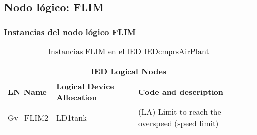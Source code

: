 
\subsection{Nodo l\'ogico: 			 FLIM}

    \subsubsection{Instancias del nodo l\'ogico FLIM}
    \begin{table}[H]
    \begin{center}
    \begin{tabular}{|l|l|p{6.8cm}|}
            \hline
            \multicolumn{3}{|c|}{\cellcolor[gray]{0.8} \textbf{IED Logical Nodes} } \\
            \hline
            \textbf{LN Name} & \textbf{Logical Device Allocation} & \textbf{Code and description} \\
            \hline
            Gv\_FLIM2 & LD1tank & (LA) Limit to reach the overspeed (speed limit) \\
            \hline
    \end{tabular}
    \caption{Instancias FLIM en el IED IEDcmprsAirPlant}
    \label{table:lnInstFLIM_}
    \end{center}
    \end{table}
    
    
    
